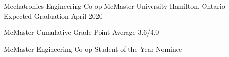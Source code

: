 
\begin{cventries}

  \cventry
    {Mechatronics Engineering Co-op} %
    {McMaster University} %
    {Hamilton, Ontario} %
    {Expected Graduation April 2020} %
    {
      \begin{cvitems} %
        \item {McMaster Cumulative Grade Point Average 3.6/4.0}
        \item {McMaster Engineering Co-op Student of the Year Nominee}
      \end{cvitems}
    }



\end{cventries}
